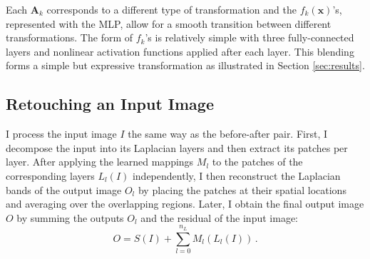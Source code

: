 Each $\mathbf{A}_k$ corresponds to a different type of transformation and the $f_k(\mathbf{x})$'s, represented with the MLP, allow for a smooth transition between different transformations. The form of $f_k$'s is relatively simple with three fully-connected layers and nonlinear activation functions applied after each layer. This blending forms a simple but expressive transformation as illustrated in Section \ref{sec:results}.

\subsection{Retouching an Input Image}

I process the input image $I$ the same way as the before-after pair. First, I decompose the input into its Laplacian layers and then extract its patches per layer. After applying the learned mappings $M_l$ to the patches of the corresponding layers $L_{l}(I)$ independently, I then reconstruct the Laplacian bands of the output image $O_l$ by placing the patches at their spatial locations and averaging over the overlapping regions. Later, I obtain the final output image $O$ by summing the outputs $O_l$ and the residual of the input image:
\begin{equation}
    O = S(I) + \sum_{l=0}^{n_L} M_l(L_l(I))\,.
\end{equation}
